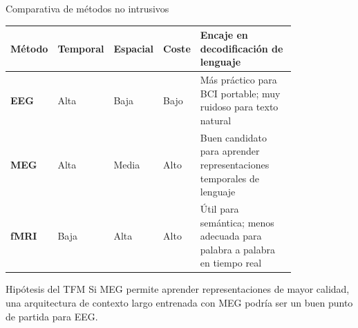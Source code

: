 \documentclass[aspectratio=169,10pt]{beamer}
\begin{document}
\begin{frame}[c]{Comparativa de métodos no intrusivos}
  \small
  \setlength{\tabcolsep}{4pt}
  \renewcommand{\arraystretch}{1.25}
  \begin{center}
  \begin{tabular}{>{\bfseries}p{0.10\linewidth}>{\centering\arraybackslash}p{0.12\linewidth}>{\centering\arraybackslash}p{0.12\linewidth}>{\centering\arraybackslash}p{0.10\linewidth}p{0.38\linewidth}}
    \toprule
    Método & Temporal & Espacial & Coste & Encaje en decodificación de lenguaje \\
    \midrule
    EEG & Alta & Baja & Bajo & Más práctico para BCI portable; muy ruidoso para texto natural \\
    MEG & Alta & Media & Alto & Buen candidato para aprender representaciones temporales de lenguaje \\
    fMRI & Baja & Alta & Alto & Útil para semántica; menos adecuada para palabra a palabra en tiempo real \\
    \bottomrule
  \end{tabular}
  \end{center}

  \vspace{4mm}

  \begin{alertblock}{Hipótesis del TFM}
    Si MEG permite aprender representaciones de mayor calidad, una arquitectura de contexto largo entrenada con MEG podría ser un buen punto de partida para EEG.
  \end{alertblock}

\end{frame}
\end{document}
